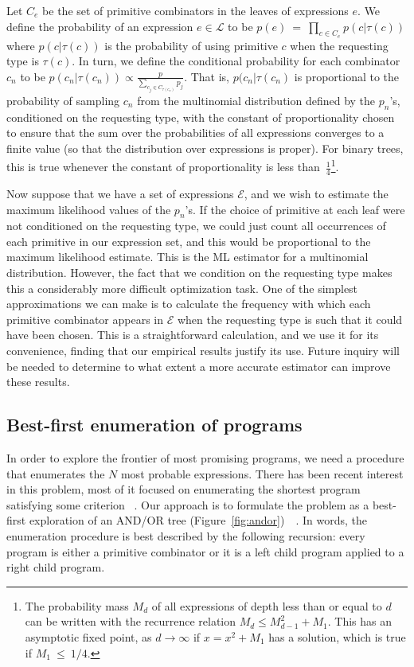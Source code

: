 \documentclass{article}
\begin{document}
Let $C_e$ be the set of primitive combinators in the leaves of
expressions $e$. We define the probability of an expression ${e \in
  \mathcal{L}}$ to be ${ p(e)~=~\prod_{c \in C_e} p(c | \tau(c)) }$
where $p(c | \tau(c))$ is the probability of using primitive $c$ when
the requesting type is $\tau(c)$. In turn, we define the conditional
probability for each combinator $c_n$ to be $p(c_n| \tau(c_n)) \propto
\frac{p}{\sum_{c_j \in C_{\tau(c_n)}} p_j}$.  That is, $p(c_n | \tau(c_n)$ is
proportional to the probability of sampling $c_n$ from the multinomial
distribution defined by the $p_n$'s, conditioned on the requesting
type, with the constant of proportionality chosen to ensure that the
sum over the probabilities of all expressions converges to a finite
value (so that the distribution over expressions is proper). For
binary trees, this is true whenever the constant of proportionality is
less than~$\frac{1}{4}$\footnote{The probability mass $M_d$ of all
  expressions of depth less than or equal to $d$ can be written with
  the recurrence relation $M_d \leq M_{d-1}^2 + M_1$. This has an
  asymptotic fixed point, as $d \rightarrow \infty$ if $x = x^2 + M_1$
  has a solution, which is true if $M_1~\leq~1/4$.}.

Now suppose that we have a set of expressions $\mathcal{E}$, and we
wish to estimate the maximum likelihood values of the $p_n$'s. If the
choice of primitive at each leaf were not conditioned on the
requesting type, we could just count all occurrences of each primitive
in our expression set, and this would be proportional to the maximum
likelihood estimate. This is the ML estimator for a multinomial
distribution. However, the fact that we condition on the requesting
type makes this a considerably more difficult optimization task. One
of the simplest approximations we can make is to calculate the
frequency with which each primitive combinator appears in
$\mathcal{E}$ when the requesting type is such that it could have
been chosen. This is a straightforward calculation, and
we use it for its convenience, finding that our empirical results
justify its use. Future inquiry will be needed to determine to what
extent a more accurate estimator can improve these results.

\subsection{Best-first enumeration of programs}
In order to explore the frontier of most promising programs, we need a
procedure that enumerates the $N$ most probable expressions. There has
been recent interest in this problem, most of it focused on
enumerating the shortest program satisfying some
criterion~\cite{DBLP:conf/sfp/Katayama05}
\cite{DBLP:conf/aaip/YakushevJ09}. Our approach is to formulate the
problem as a best-first exploration of an AND/OR tree
(Figure~\ref{fig:andor})~\cite{nilsson1982principles}~\cite{DBLP:journals/cacm/Hall73}. In
words, the enumeration procedure is best described by the following
recursion: every program is either a primitive combinator or it is a
left child program applied to a right child program.
\end{document}
